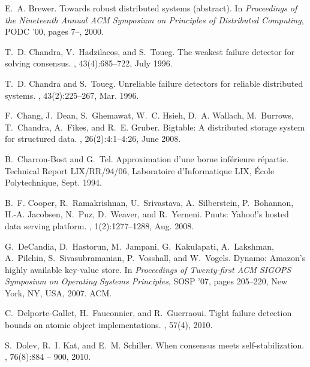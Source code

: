\documentclass[11pt]{article}
\newcommand{\no}{\textrm{No}}
\begin{document}
\def\noopsort#1{} \def\No{\kern-.25em\lower.2ex\hbox{\char'27}}
  \def\no#1{\relax} \def\http#1{{\\{\small\tt
  http://www-litp.ibp.fr:80/{}#1}}}
\begin{thebibliography}{10}

E.~A. Brewer.
\newblock Towards robust distributed systems (abstract).
\newblock In {\em Proceedings of the Nineteenth Annual ACM Symposium on
  Principles of Distributed Computing}, PODC '00, pages 7--, 2000.

T.~D. Chandra, V.~Hadzilacos, and S.~Toueg.
\newblock The weakest failure detector for solving consensus.
, 43(4):685--722, July 1996.

T.~D. Chandra and S.~Toueg.
\newblock Unreliable failure detectors for reliable distributed systems.
, 43(2):225--267, Mar. 1996.

F.~Chang, J.~Dean, S.~Ghemawat, W.~C. Hsieh, D.~A. Wallach, M.~Burrows,
  T.~Chandra, A.~Fikes, and R.~E. Gruber.
\newblock Bigtable: A distributed storage system for structured data.
, 26(2):4:1--4:26, June 2008.

B.~Charron-Bost and G.~Tel.
\newblock Approximation d'une borne inf\'erieure r\'epartie.
\newblock Technical Report LIX/RR/94/06, Laboratoire d'Informatique LIX,
  \'Ecole Polytechnique, Sept. 1994.

B.~F. Cooper, R.~Ramakrishnan, U.~Srivastava, A.~Silberstein, P.~Bohannon,
  H.-A. Jacobsen, N.~Puz, D.~Weaver, and R.~Yerneni.
\newblock Pnuts: Yahoo!'s hosted data serving platform.
, 1(2):1277--1288, Aug. 2008.

G.~DeCandia, D.~Hastorun, M.~Jampani, G.~Kakulapati, A.~Lakshman, A.~Pilchin,
  S.~Sivasubramanian, P.~Vosshall, and W.~Vogels.
\newblock Dynamo: Amazon's highly available key-value store.
\newblock In {\em Proceedings of Twenty-first ACM SIGOPS Symposium on Operating
  Systems Principles}, SOSP '07, pages 205--220, New York, NY, USA, 2007. ACM.

C.~Delporte-Gallet, H.~Fauconnier, and R.~Guerraoui.
\newblock Tight failure detection bounds on atomic object implementations.
, 57(4), 2010.

S.~Dolev, R.~I. Kat, and E.~M. Schiller.
\newblock When consensus meets self-stabilization.
, 76(8):884 -- 900,
  2010.


\end{thebibliography}
\end{document}
